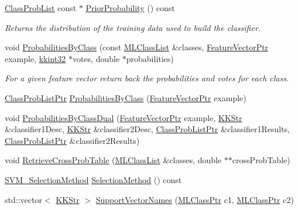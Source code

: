 \begin{DoxyCompactItemize}
\item 
\hyperlink{class_k_k_m_l_l_1_1_class_prob_list}{Class\+Prob\+List} const $\ast$ \hyperlink{class_k_k_m_l_l_1_1_classifier2_a382c5b5b39b975f2234d59da21503872}{Prior\+Probability} () const 
\begin{DoxyCompactList}\small\item\em Returns the distribution of the training data used to build the classifier. \end{DoxyCompactList}\item 
void \hyperlink{class_k_k_m_l_l_1_1_classifier2_aa07fe8d55a8b09ea2d2051f5a7cdb72c}{Probabilities\+By\+Class} (const \hyperlink{class_k_k_m_l_l_1_1_m_l_class_list}{M\+L\+Class\+List} \&classes, \hyperlink{namespace_k_k_m_l_l_a0c5df3d48f45926fbc4fee04f5e3bc04}{Feature\+Vector\+Ptr} example, \hyperlink{namespace_k_k_b_a8fa4952cc84fda1de4bec1fbdd8d5b1b}{kkint32} $\ast$votes, double $\ast$probabilities)
\begin{DoxyCompactList}\small\item\em For a given feature vector return back the probabilities and votes for each class. \end{DoxyCompactList}\item 
\hyperlink{namespace_k_k_m_l_l_a60f96a524ddb189eff2b4391cf0b651c}{Class\+Prob\+List\+Ptr} \hyperlink{class_k_k_m_l_l_1_1_classifier2_a936d89e424cfee17f7774a0558ef832e}{Probabilities\+By\+Class} (\hyperlink{namespace_k_k_m_l_l_a0c5df3d48f45926fbc4fee04f5e3bc04}{Feature\+Vector\+Ptr} example)
\item 
void \hyperlink{class_k_k_m_l_l_1_1_classifier2_ad1b24e33c560fe175457ba91a721b0c0}{Probabilities\+By\+Class\+Dual} (\hyperlink{namespace_k_k_m_l_l_a0c5df3d48f45926fbc4fee04f5e3bc04}{Feature\+Vector\+Ptr} example, \hyperlink{class_k_k_b_1_1_k_k_str}{K\+K\+Str} \&classifier1\+Desc, \hyperlink{class_k_k_b_1_1_k_k_str}{K\+K\+Str} \&classifier2\+Desc, \hyperlink{namespace_k_k_m_l_l_a60f96a524ddb189eff2b4391cf0b651c}{Class\+Prob\+List\+Ptr} \&classifier1\+Results, \hyperlink{namespace_k_k_m_l_l_a60f96a524ddb189eff2b4391cf0b651c}{Class\+Prob\+List\+Ptr} \&classifier2\+Results)
\item 
void \hyperlink{class_k_k_m_l_l_1_1_classifier2_a9fdcd344817bbcff82642f71719d60ee}{Retrieve\+Cross\+Prob\+Table} (\hyperlink{class_k_k_m_l_l_1_1_m_l_class_list}{M\+L\+Class\+List} \&classes, double $\ast$$\ast$cross\+Prob\+Table)
\item 
\hyperlink{namespace_k_k_m_l_l_afab7be632987641e5805e770be7f6bf8}{S\+V\+M\+\_\+\+Selection\+Method} \hyperlink{class_k_k_m_l_l_1_1_classifier2_af3ae9d288918bc3ad6cfa8e8c448d9c5}{Selection\+Method} () const 
\item 
std\+::vector$<$ \hyperlink{class_k_k_b_1_1_k_k_str}{K\+K\+Str} $>$ \hyperlink{class_k_k_m_l_l_1_1_classifier2_a72853c6e6ee8f184b69f46be3bb953a8}{Support\+Vector\+Names} (\hyperlink{namespace_k_k_m_l_l_ac272393853d59e72e8456f14cd6d8c23}{M\+L\+Class\+Ptr} c1, \hyperlink{namespace_k_k_m_l_l_ac272393853d59e72e8456f14cd6d8c23}{M\+L\+Class\+Ptr} c2)
\end{DoxyCompactItemize}


